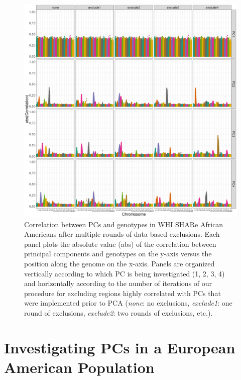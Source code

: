 \documentclass[12pt]{article}
\begin{document}
\begin{figure}[!htb]
\center
\includegraphics[width=\textwidth]{figs/pc_geno_corr/pc_geno_corr_compare_exclude}
\caption{Correlation between PCs and genotypes in WHI SHARe African Americans after multiple rounds of data-based exclusions. Each panel plots the absolute value (abs) of the correlation between principal components and genotypes on the y-axis versus the position along the genome on the x-axis.  Panels are organized vertically according to which PC is being investigated (1, 2, 3, 4) and horizontally according to the number of iterations of our procedure for excluding regions highly correlated with PCs that were implemented prior to PCA (\textit{none}: no exclusions, \textit{exclude1}: one round of exclusions, \textit{exclude2}: two rounds of exclusions, etc.).}
\label{fig:corr-compare-exclude}
\end{figure}



\newpage
\section{Investigating PCs in a European American Population}
\end{document}
